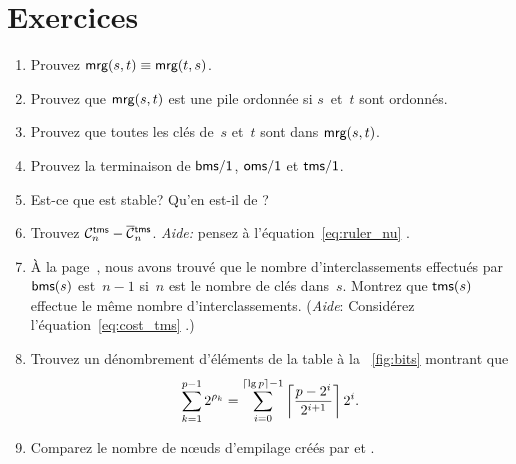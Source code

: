 \section*{Exercices}

\begin{enumerate}

  \item Prouvez \(\textsf{mrg}(s,t) \equiv \textsf{mrg}(t,s)\).

  \item Prouvez que \(\textsf{mrg}(s,t)\) est une
    pile ordonnée si \(s\)~et~\(t\) sont ordonnés.

  \item Prouvez que toutes les clés de~\(s\) et~\(t\) sont dans
  \(\textsf{mrg}(s,t)\).

  \item Prouvez la terminaison de \(\textsf{bms/1}\), \(\textsf{oms/1}\) et
    \(\textsf{tms/1}\).

  \item Est-ce que  est stable? Qu'en est-il de ?

  \item Trouvez \(\C{\fun{tms}}{n} - \OC{\fun{tms}}{n}\). \emph{Aide:}
    pensez à l'équation~\eqref{eq:ruler_nu} .

  \item À la page~\pageref{eq:bms_merges}, nous avons trouvé que le
    nombre d'interclassements effectués par \(\textsf{bms}(s)\)
    est~\(n-1\) si~\(n\) est le nombre de clés dans~\(s\). Montrez que
    \(\textsf{tms}(s)\) effectue le même nombre
    d'interclassements. (\emph{Aide}: Considérez
    l'équation~\eqref{eq:cost_tms} .)

  \item Trouvez un dénombrement d'éléments de la table à la
    \fig~\vref{fig:bits} montrant que
    \begin{equation*}
      \sum_{k=1}^{p-1}{2^{\rho_k}}
      = \sum_{i=0}^{\ceiling{\lg p}-1}%
      {\left\lceil\frac{p-2^i}{2^{i+1}}\right\rceil 2^i}.
    \end{equation*}

  \item Comparez le nombre de n{\oe}uds d'empilage créés par  et .

\end{enumerate}

